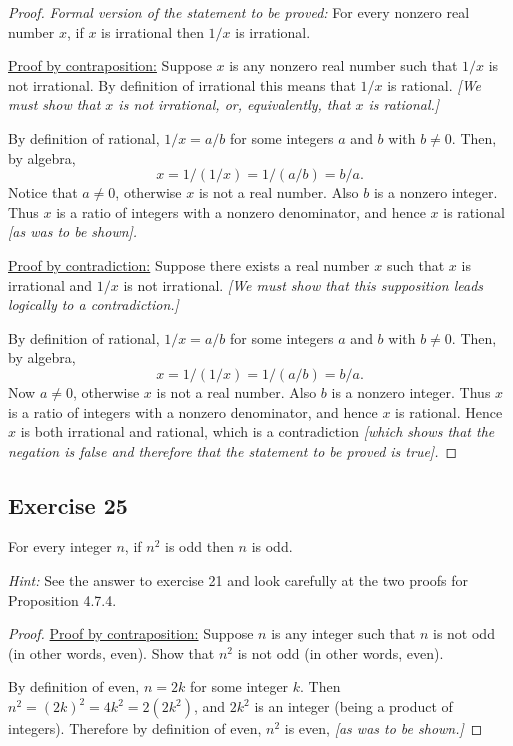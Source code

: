 \documentclass[14pt]{extarticle}
\begin{document}
\begin{proof}
    {\it Formal version of the statement to be proved:} For every nonzero real number $x$, if $x$ is irrational then $1/x$ is irrational.

    \underline{Proof by contraposition:} Suppose $x$ is any nonzero real number such that $1/x$ is not irrational. By definition of irrational this means that $1/x$ is rational. {\it [We must show that $x$ is not irrational, or, equivalently, that $x$ is rational.]}

    By definition of rational, $1/x = a/b$ for some integers $a$ and $b$ with $b \neq 0$. Then, by algebra,
    \[
        x = 1/(1/x) = 1/(a/b) = b/a.
    \]
    Notice that $a \neq 0$, otherwise $x$ is not a real number. Also $b$ is a nonzero integer. Thus $x$ is a ratio of integers with a nonzero denominator, and hence $x$ is rational {\it [as was to be shown].}

    \underline{Proof by contradiction:} Suppose there exists a real number $x$ such that $x$ is irrational and $1/x$ is not irrational. {\it [We must show that this supposition leads logically to a contradiction.]}

    By definition of rational, $1/x = a/b$ for some integers $a$ and $b$ with $b \neq 0$. Then, by algebra,
    \[
        x = 1/(1/x) = 1/(a/b) = b/a.
    \]
    Now $a \neq 0$, otherwise $x$ is not a real number. Also $b$ is a nonzero integer. Thus $x$ is a ratio of integers with a nonzero denominator, and hence $x$ is rational. Hence $x$ is both irrational and rational, which is a contradiction {\it [which shows that the negation is false and therefore that the statement to be proved is true].}
\end{proof}

\subsection{Exercise 25}
For every integer $n$, if $n^2$ is odd then $n$ is odd.

    {\it Hint:} See the answer to exercise 21 and look carefully at the two proofs for Proposition 4.7.4.

\begin{proof}
    \underline{Proof by contraposition:} Suppose $n$ is any integer such that $n$ is not odd (in other words, even). Show that $n^2$ is not odd (in other words, even).

    By definition of even, $n = 2k$ for some integer $k$. Then $n^2 = (2k)^2 = 4k^2 = 2(2k^2)$, and $2k^2$ is an integer (being a product of integers). Therefore by definition of even, $n^2$ is even, {\it [as was to be shown.]}
\end{proof}
\end{document}
